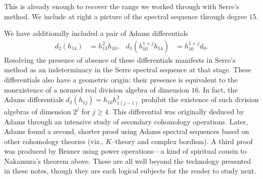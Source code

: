 \noindent
{}
This is already enough to recover the range we worked through with Serre's method.
We include at right a picture of the spectral sequence through degree $15$.

\begin{remark}
We have additionally included a pair of Adams differentials
\begin{align*}
d_2(h_{14}) & = h_{13}^2 h_{10}, &
d_3(h_{10}^{1+j} h_{14}) & = h_{10}^{1+j} d_0.
\end{align*}
Resolving the presence of absence of these differentials manifests in Serre's method as an indeterminacy in the Serre spectral sequence at that stage.
These differentials also have a geometric origin: their presence is equivalent to the nonexistence of a normed real division algebra of dimension $16$.
In fact, the Adams differentials $d_2(h_{1j}) = h_{10} h_{1(j-1)}^2$ prohibit the existence of such division algebras of dimension $2^j$ for $j \ge 4$.
This differential was originally deduced by Adams through an intensive study of secondary cohomology operations.
Later, Adams found a second, shorter proof using Adams spectral sequences based on other cohomology theories (viz., $K$--theory and complex bordism).
A third proof was produced by Bruner using power operations---a kind of spiritual cousin to Nakamura's theorem above.
These are all well beyond the technology presented in these notes, though they are each logical subjects for the reader to study next.
\end{remark}

